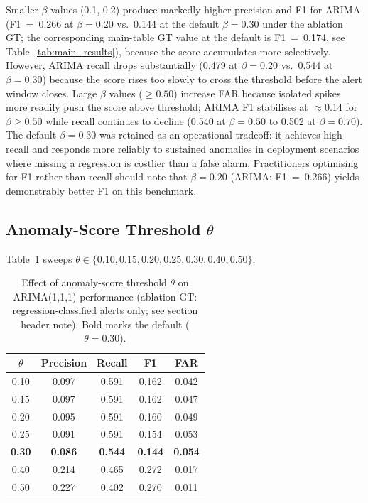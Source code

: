 \documentclass[a4paper,fleqn]{cas-sc}
\theoremstyle{plain}
\begin{document}
Smaller $\beta$ values (0.1, 0.2) produce markedly higher precision and F1
for ARIMA (F1~=~0.266 at $\beta=0.20$ vs.\ 0.144 at the default $\beta=0.30$
under the ablation GT; the corresponding main-table GT value at the default
is F1~=~0.174, see Table~\ref{tab:main_results}),
because the score accumulates more selectively.
However, ARIMA recall drops substantially (0.479 at $\beta=0.20$ vs.~0.544 at $\beta=0.30$)
because the score rises too slowly to cross the threshold before the alert window
closes.
Large $\beta$ values ($\geq 0.50$) increase FAR because isolated spikes more readily push
the score above threshold; ARIMA F1 stabilises at $\approx$0.14 for $\beta \geq 0.50$
while recall continues to decline (0.540 at $\beta=0.50$ to 0.502 at $\beta=0.70$).
The default $\beta = 0.30$ was retained as an operational tradeoff: it achieves
high recall and responds more reliably to sustained anomalies in deployment
scenarios where missing a regression is costlier than a false alarm.
Practitioners optimising for F1 rather than recall should note that
$\beta = 0.20$ (ARIMA: F1~=~0.266) yields demonstrably better F1 on this benchmark.

\subsection{Anomaly-Score Threshold \texorpdfstring{$\theta$}{theta}}\label{sec:ablation:threshold}

Table~\ref{tab:ablation_threshold} sweeps $\theta \in \{0.10, 0.15, 0.20, 0.25,
0.30, 0.40, 0.50\}$.

\begin{table}[tbp]
\centering
\begin{tabular}{ccccc}
\toprule
$\theta$ & Precision & Recall & F1 & FAR \\
\midrule
0.10 & 0.097 & 0.591 & 0.162 & 0.042 \\
0.15 & 0.097 & 0.591 & 0.162 & 0.047 \\
0.20 & 0.095 & 0.591 & 0.160 & 0.049 \\
0.25 & 0.091 & 0.591 & 0.154 & 0.053 \\
\textbf{0.30} & \textbf{0.086} & \textbf{0.544} & \textbf{0.144} & \textbf{0.054} \\
0.40 & 0.214 & 0.465 & 0.272 & 0.017 \\
0.50 & 0.227 & 0.402 & 0.270 & 0.011 \\
\bottomrule
\end{tabular}
\caption{Effect of anomaly-score threshold $\theta$ on ARIMA(1,1,1) performance
  (ablation GT: regression-classified alerts only; see section header note).
  Bold marks the default ($\theta = 0.30$).}
\label{tab:ablation_threshold}
\end{table}
\end{document}
